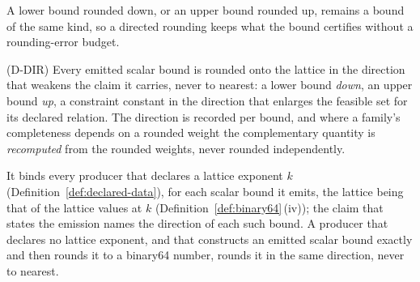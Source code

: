 
A lower bound rounded down, or an upper bound rounded up, remains a bound of the
same kind, so a directed rounding keeps what the bound certifies without a
rounding-error budget.

\begin{requirement}\label{req:rounding-direction}
(D-DIR) Every emitted scalar bound is rounded onto the lattice in the direction
that weakens the claim it carries, never to nearest: a lower bound \emph{down},
an upper bound \emph{up}, a constraint constant in the direction that enlarges
the feasible set for its declared relation. The direction is recorded per
bound, and where a family's completeness depends on a rounded weight the
complementary quantity is \emph{recomputed} from the rounded weights, never
rounded independently.

It binds every producer that declares a lattice exponent $k$
(Definition~\ref{def:declared-data}), for each scalar bound it emits, the
lattice being that of the lattice values at $k$
(Definition~\ref{def:binary64}\,(iv)); the claim that states the emission names
the direction of each such bound. A producer that declares no lattice exponent,
and that constructs an emitted scalar bound exactly and then rounds it to a
binary64 number, rounds it in the same direction, never to nearest.
\end{requirement}
